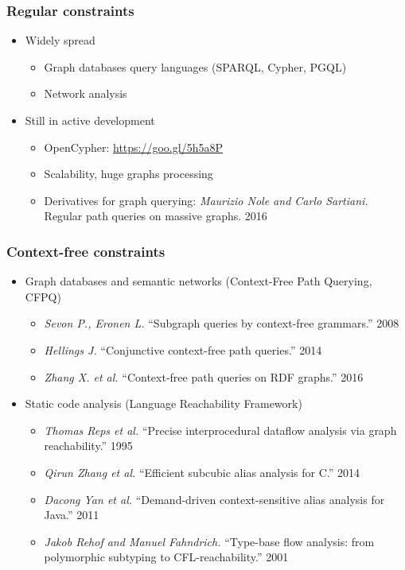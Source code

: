\documentclass[xcolor=table,aspectratio=169]{beamer}
\begin{document}
\begin{frame}[fragile]
  \transwipe[direction=90]
  \frametitle{Regular constraints}
  \begin{itemize}
   \item Widely spread
    \begin{itemize}
      \item Graph databases query languages (SPARQL, Cypher, PGQL)
	  \item Network analysis
    \end{itemize}  
	\item Still in active development
	\begin{itemize}
      \item OpenCypher: \url{https://goo.gl/5h5a8P}
	  \item Scalability, huge graphs processing
	  \item Derivatives for graph querying: \emph{Maurizio Nole and Carlo Sartiani.} Regular path queries on massive graphs. 2016
    \end{itemize}  	
  \end{itemize}
\end{frame}


\begin{frame}[fragile]
  \transwipe[direction=90]
  \frametitle{Context-free constraints}
  \begin{itemize}
  \item Graph databases and semantic networks (Context-Free Path Querying, CFPQ)
    \begin{itemize}
        \item \emph{Sevon P., Eronen L.} ``Subgraph queries by context-free grammars.'' 2008
        \item \emph{Hellings J.} ``Conjunctive context-free path queries.'' 2014
        \item \emph{Zhang X. et al.} ``Context-free path queries on RDF graphs.'' 2016
    \end{itemize}
    \item Static code analysis (Language Reachability Framework)
    \begin{itemize}
        \item \emph{Thomas Reps et al.} ``Precise interprocedural dataflow analysis via graph reachability.'' 1995 
        \item \emph{Qirun Zhang et al.}  ``Efficient subcubic alias analysis for C.'' 2014
        \item \emph{Dacong Yan et al.} ``Demand-driven context-sensitive alias analysis for Java.'' 2011
        \item \emph{Jakob Rehof and Manuel Fahndrich.} ``Type-base flow analysis: from polymorphic subtyping to CFL-reachability.'' 2001
    \end{itemize}
  \end{itemize}
\end{frame}
\end{document}
